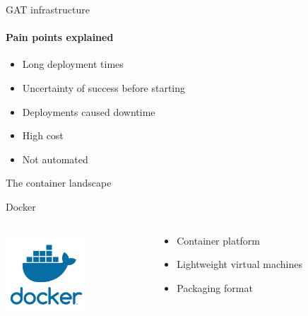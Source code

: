 \documentclass[14pt]{beamer}
\newcommand{\imageframe}[2]{{
  \usebackgroundtemplate{\texttt{[image: \#1]}}
  \begin{frame}{\vspace{-6pt}\usebeamercolor[fg]{item}\huge{#2}}
  \end{frame}
}}
\begin{document}
  \begin{frame}{GAT infrastructure}
  \framesubtitle{Pain points explained}
  \begin{itemize}
    \item Long deployment times
    \item Uncertainty of success before starting
    \item Deployments caused downtime
    \item High cost
    \item Not automated
  \end{itemize}
  \end{frame}


  \imageframe{images/container_landscape.jpg}{The container landscape}

  \begin{frame}{Docker}
    \begin{columns}[c]
      \begin{column}{.3\textwidth}
          \includegraphics[width=3cm,height=3cm]{images/docker_logo.png}
      \end{column}
      \begin{column}{.7\textwidth}
        \begin{itemize}
          \item Container platform
          \item Lightweight virtual machines
          \item Packaging format
        \end{itemize}
      \end{column}
    \end{columns}
  \end{frame}
\end{document}
